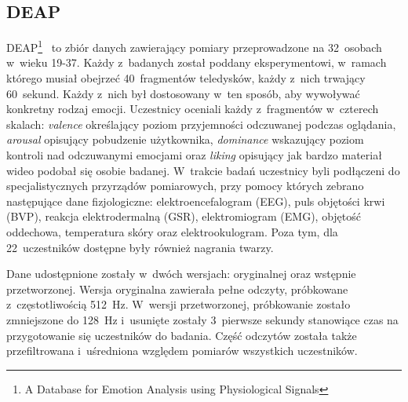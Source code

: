 \subsection{DEAP}
DEAP\footnote{A Database for Emotion Analysis using Physiological Signals}~\cite{deap_dataset_2011} to zbiór danych zawierający pomiary przeprowadzone na 32~osobach w~wieku 19-37. Każdy z~badanych został poddany eksperymentowi, w~ramach którego musiał obejrzeć 40~fragmentów teledysków, każdy z~nich trwający 60~sekund. Każdy z~nich był dostosowany w~ten sposób, aby wywoływać konkretny rodzaj emocji. Uczestnicy oceniali każdy z~fragmentów w~czterech skalach: \textit{valence} określający poziom przyjemności odczuwanej podczas oglądania, \textit{arousal} opisujący pobudzenie użytkownika, \textit{dominance} wskazujący poziom kontroli nad odczuwanymi emocjami oraz \textit{liking} opisujący jak bardzo materiał wideo podobał się osobie badanej. W~trakcie badań uczestnicy byli podłączeni do specjalistycznych przyrządów pomiarowych, przy pomocy których zebrano następujące dane fizjologiczne: elektroencefalogram (EEG), puls objętości krwi (BVP), reakcja elektrodermalną (GSR), elektromiogram (EMG), objętość oddechowa, temperatura skóry oraz elektrookulogram. Poza tym, dla 22~uczestników dostępne były również nagrania twarzy. 

Dane udostępnione zostały w~dwóch wersjach: oryginalnej oraz wstępnie przetworzonej. Wersja oryginalna zawierała pełne odczyty, próbkowane z~częstotliwością 512~Hz. W~wersji przetworzonej, próbkowanie zostało zmniejszone do 128~Hz i~usunięte zostały 3~pierwsze sekundy stanowiące czas na przygotowanie się uczestników do badania. Część odczytów została także przefiltrowana i~uśredniona względem pomiarów wszystkich uczestników.

